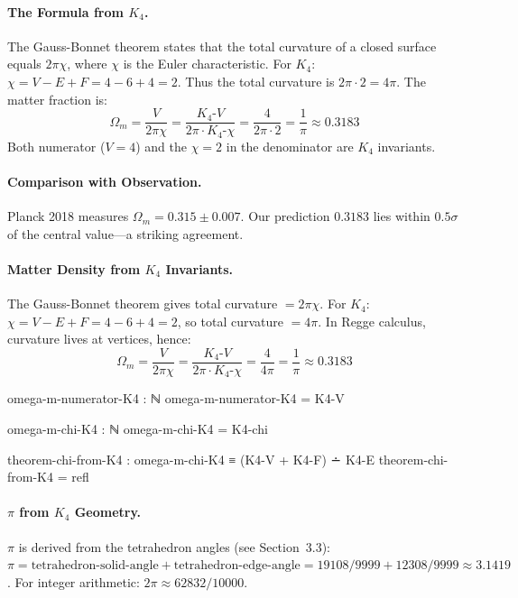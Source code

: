 \documentclass[11pt,a4paper]{book}
\begin{document}
\paragraph{The Formula from $K_4$.}
The Gauss-Bonnet theorem states that the total curvature of a closed surface equals $2\pi\chi$,
where $\chi$ is the Euler characteristic. For $K_4$: $\chi = V - E + F = 4 - 6 + 4 = 2$.
Thus the total curvature is $2\pi \cdot 2 = 4\pi$. The matter fraction is:
\[
\Omega_m = \frac{V}{2\pi\chi} = \frac{K_4\text{-}V}{2\pi \cdot K_4\text{-}\chi} = \frac{4}{2\pi \cdot 2} = \frac{1}{\pi} \approx 0.3183
\]
Both numerator ($V=4$) and the $\chi=2$ in the denominator are $K_4$ invariants.

\paragraph{Comparison with Observation.}
Planck 2018 measures $\Omega_m = 0.315 \pm 0.007$. Our prediction $0.3183$ lies 
within $0.5\sigma$ of the central value---a striking agreement.

\paragraph{Matter Density from $K_4$ Invariants.}
The Gauss-Bonnet theorem gives total curvature $= 2\pi\chi$.
For $K_4$: $\chi = V - E + F = 4 - 6 + 4 = 2$, so total curvature $= 4\pi$.
In Regge calculus, curvature lives at vertices, hence:
\[
\Omega_m = \frac{V}{2\pi\chi} = \frac{K_4\text{-}V}{2\pi \cdot K_4\text{-}\chi} = \frac{4}{4\pi} = \frac{1}{\pi} \approx 0.3183
\]

\begin{code}
omega-m-numerator-K4 : ℕ
omega-m-numerator-K4 = K4-V

omega-m-chi-K4 : ℕ
omega-m-chi-K4 = K4-chi

theorem-chi-from-K4 : omega-m-chi-K4 ≡ (K4-V + K4-F) ∸ K4-E
theorem-chi-from-K4 = refl

\end{code}

\paragraph{$\pi$ from $K_4$ Geometry.}
$\pi$ is derived from the tetrahedron angles (see Section~3.3):
$\pi = \text{tetrahedron-solid-angle} + \text{tetrahedron-edge-angle} = 19108/9999 + 12308/9999 \approx 3.1419$.
For integer arithmetic: $2\pi \approx 62832/10000$.
\end{document}
